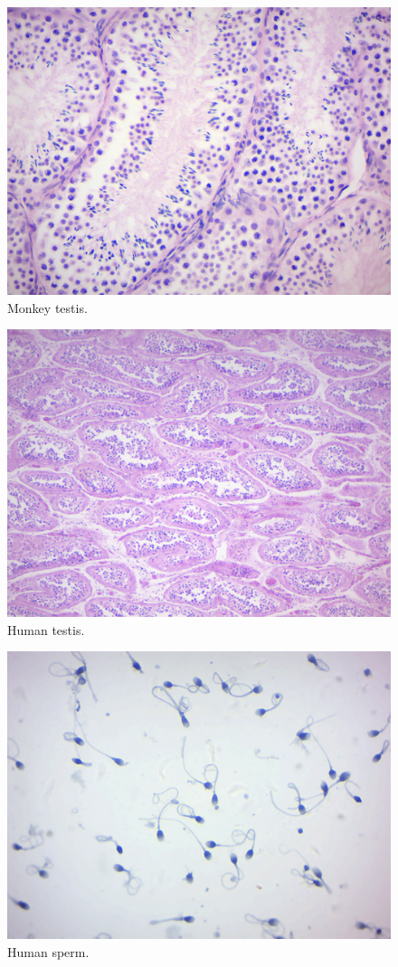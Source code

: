 \begin{figure}

{\centering \includegraphics[width=0.7\linewidth]{./figures/development/monkey_testis}

}

\caption{Monkey testis.}\label{fig:monkeytestis}
\end{figure}

\begin{figure}

{\centering \includegraphics[width=0.7\linewidth]{./figures/development/human_testis}

}

\caption{Human testis.}\label{fig:humantestis}
\end{figure}

\begin{figure}

{\centering \includegraphics[width=0.7\linewidth]{./figures/development/human_sperm}

}

\caption{Human sperm.}\label{fig:sperm}
\end{figure}

